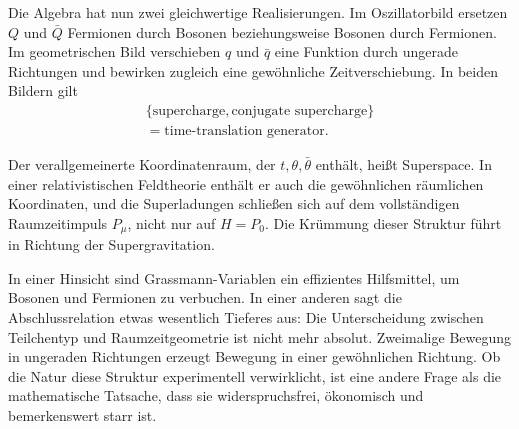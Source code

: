 Die Algebra hat nun zwei gleichwertige Realisierungen. Im Oszillatorbild ersetzen \(Q\) und \(\bar Q\) Fermionen durch Bosonen beziehungsweise Bosonen durch Fermionen. Im geometrischen Bild verschieben \(q\) und \(\bar q\) eine Funktion durch ungerade Richtungen und bewirken zugleich eine gewöhnliche Zeitverschiebung. In beiden Bildern gilt
\begin{equation}
\begin{gathered}
\{\text{supercharge},\text{conjugate supercharge}\}\\
=\text{time-translation generator}.
\end{gathered}
\end{equation}

Der verallgemeinerte Koordinatenraum, der \(t,\theta,\bar\theta\) enthält, heißt Superspace. In einer relativistischen Feldtheorie enthält er auch die gewöhnlichen räumlichen Koordinaten, und die Superladungen schließen sich auf dem vollständigen Raumzeitimpuls \(P_\mu\), nicht nur auf \(H=P_0\). Die Krümmung dieser Struktur führt in Richtung der Supergravitation.

In einer Hinsicht sind Grassmann-Variablen ein effizientes Hilfsmittel, um Bosonen und Fermionen zu verbuchen. In einer anderen sagt die Abschlussrelation etwas wesentlich Tieferes aus: Die Unterscheidung zwischen Teilchentyp und Raumzeitgeometrie ist nicht mehr absolut. Zweimalige Bewegung in ungeraden Richtungen erzeugt Bewegung in einer gewöhnlichen Richtung. Ob die Natur diese Struktur experimentell verwirklicht, ist eine andere Frage als die mathematische Tatsache, dass sie widerspruchsfrei, ökonomisch und bemerkenswert starr ist.
